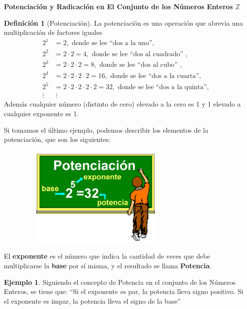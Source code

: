 \documentclass[12pt]{examdesign}
\theoremstyle{plain}
\theoremstyle{definition}
\newtheorem{exa}[theorem]{Ejemplo}
\newtheorem{defi}[theorem]{Definición}
\theoremstyle{remark}
\begin{document}
	\begin{endmatter}
		\vspace{.2cm}
		\centerline{\large \textcolor{upforestgreen}{\textbf{Potenciación y Radicación en El Conjunto de los Números Enteros ${\mathbb Z}$}}}
		\vspace{.2cm}
		\begin{tcolorbox}[colback=red!10!white, colframe=tealgreen, title=\textbf{Material de consulta}]
			\begin{defi}[Potenciación]
					La potenciación es una operación que abrevia una multiplicación de factores iguales
				\begin{align*}
				2^{1} &= 2,\mbox{ dende se lee ``dos a la uno''},\\
				2^{2} &= 2\cdot 2=4,\mbox{ donde se lee ``dos al cuadrado'' },\\
				2^{3} &= 2\cdot 2\cdot 2=8,\mbox{ donde se lee ``dos al cubo'' },\\
				2^{4} &= 2\cdot 2\cdot 2\cdot 2=16,\mbox{ donde se lee ``dos a la cuarta''},\\
				2^{5} &= 2\cdot 2\cdot 2\cdot 2\cdot 2=32,\mbox{ donde se lee ``dos a la quinta''},\\
				\vdots&\;\vdots
				\end{align*}
				Además cualquier número (distinto de cero) elevado a la cero es 1 y 1 elevado a cualquier exponente es 1. 
			\end{defi}
		\end{tcolorbox}
		\vspace{.2cm}
		
		Si tomamos el último ejemplo, podemos describir los elementos de la potenciación, que son los siguientes:
		
		\begin{center}
			\includegraphics[width=10cm, height=5cm]{descarga.png}
		\end{center} 
		El \textbf{exponente} es el número que indica la cantidad de veces que debe multiplicarse la \textbf{base} por sí misma, y el resultado se llama \textbf{Potencia}.
		\vspace{.2cm}
		\begin{tcolorbox}[opteqC]
			\begin{exa}
				Siguiendo el concepto de Potencia en el conjunto de los Números Enteros, se tiene que: ``Si el exponente es par, la potencia lleva signo positivo. Si el exponente es impar, la potencia lleva el signo de la base''
				

\end{exa}
\end{tcolorbox}
\end{endmatter}
\end{document}
